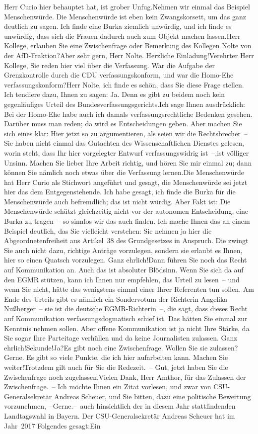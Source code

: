 \documentclass{article}
\begin{document}
Herr Curio hier behauptet hat, ist grober Unfug.Nehmen wir einmal das Beispiel Menschenwürde. Die Menschenwürde ist eben kein Zwangskorsett, um das ganz deutlich zu sagen. Ich finde eine Burka ziemlich unwürdig, und ich finde es unwürdig, dass sich die Frauen dadurch auch zum Objekt machen lassen.Herr Kollege, erlauben Sie eine Zwischenfrage oder Bemerkung des Kollegen Nolte von der AfD-Fraktion?Aber sehr gern, Herr Nolte. Herzliche Einladung!Verehrter Herr Kollege, Sie reden hier viel über die Verfassung. War die Aufgabe der Grenzkontrolle durch die CDU verfassungskonform, und war die Homo-Ehe verfassungskonform?Herr Nolte, ich finde es schön, dass Sie diese Frage stellen. Ich tendiere dazu, Ihnen zu sagen: Ja. Denn es gibt zu beidem noch kein gegenläufiges Urteil des Bundesverfassungsgerichts.Ich sage Ihnen ausdrücklich: Bei der Homo-Ehe habe auch ich damals verfassungsrechtliche Bedenken gesehen. Darüber muss man reden; da wird es Entscheidungen geben. Aber machen Sie sich eines klar: Hier jetzt so zu argumentieren, als seien wir die Rechtsbrecher – Sie haben nicht einmal das Gutachten des Wissenschaftlichen Dienstes gelesen, worin steht, dass Ihr hier vorgelegter Entwurf verfassungswidrig ist –,ist völliger Unsinn. Machen Sie lieber Ihre Arbeit richtig, und hören Sie mir einmal zu; dann können Sie nämlich noch etwas über die Verfassung lernen.Die Menschenwürde hat Herr Curio als Stichwort angeführt und gesagt, die Menschenwürde sei jetzt hier das dem Entgegenstehende. Ich habe gesagt, ich finde die Burka für die Menschenwürde auch befremdlich; das ist nicht würdig. Aber Fakt ist: Die Menschenwürde schützt gleichzeitig nicht vor der autonomen Entscheidung, eine Burka zu tragen – so sinnlos wir das auch finden. Ich mache Ihnen das an einem Beispiel deutlich, das Sie vielleicht verstehen: Sie nehmen ja hier die Abgeordnetenfreiheit aus Artikel 38 des Grundgesetzes in Anspruch. Die zwingt Sie auch nicht dazu, richtige Anträge vorzulegen, sondern sie erlaubt es Ihnen, hier so einen Quatsch vorzulegen. Ganz ehrlich!Dann führen Sie noch das Recht auf Kommunikation an. Auch das ist absoluter Blödsinn. Wenn Sie sich da auf den EGMR stützen, kann ich Ihnen nur empfehlen, das Urteil zu lesen – und wenn Sie nicht, hätte das wenigstens einmal einer Ihrer Referenten tun sollen. Am Ende des Urteils gibt es nämlich ein Sondervotum der Richterin Angelika Nußberger – sie ist die deutsche ­EGMR-Richterin –, die sagt, dass dieses Recht auf Kommunikation verfassungsdogmatisch schief ist. Das hätten Sie einmal zur Kenntnis nehmen sollen. Aber offene Kommunikation ist ja nicht Ihre Stärke, da Sie sogar Ihre Parteitage verhüllen und da keine Journalisten zulassen. Ganz ehrlich!Sekunde!Ja?Es gibt noch eine Zwischenfrage. Wollen Sie sie zulassen?Gerne. Es gibt so viele Punkte, die ich hier aufarbeiten kann. Machen Sie weiter!Trotzdem gilt auch für Sie die Redezeit. – Gut, jetzt haben Sie die Zwischenfrage noch zugelassen.Vielen Dank, Herr Amthor, für das Zulassen der Zwischenfrage. – Ich möchte Ihnen ein Zitat vorlesen, und zwar von CSU-Generalsekretär Andreas Scheuer, und Sie bitten, dazu eine politische Bewertung vorzunehmen, –Gerne.– auch hinsichtlich der in diesem Jahr stattfindenden Landtagswahl in Bayern. Der CSU-Generalsekretär Andreas Scheuer hat im Jahr 2017 Folgendes gesagt:Ein 
\end{document}
